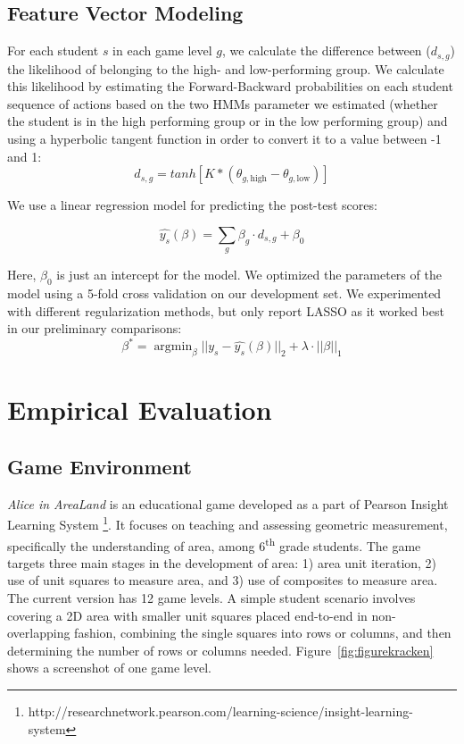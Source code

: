 \documentclass{sigchi}
\DeclareMathOperator*{\argmin}{argmin}
\begin{document}
\subsection{Feature Vector Modeling}

For each student $s$ in each game level $g$, we calculate the difference between ($d_{s,g}$) the likelihood of belonging to the high- and low-performing group.
We calculate this likelihood by estimating the Forward-Backward probabilities  on each student sequence of actions  based on the two HMMs parameter we estimated (whether the student is in the high performing group or in the low performing group) and using a hyperbolic tangent function in order to convert it to a value between -1 and 1: 
\begin{equation}
d_{s,g} = tanh[ K * (\theta_{g, \text{high}} - \theta_{g, \text{low}})]
\end{equation}

We use  a linear regression model for predicting the post-test scores:

\begin{equation}
\hat {y_s}(\beta) =   \sum_g \beta_g \cdot d_{s,g}  + \beta_0
\end{equation}

Here, $\beta_0$ is just an intercept for the  model.  
We optimized the parameters of the model using a 5-fold cross validation on our development set.
We experimented with different regularization methods, but only report LASSO \cite{tibshirani1996regression} as it worked best in our preliminary comparisons:
\begin{equation}
\beta^* = \argmin_\beta || y_s - \hat{y_s}(\beta)  ||_2 + \lambda \cdot || \beta ||_1
\end{equation}


\section{Empirical Evaluation}

\subsection{Game Environment}
\textit {Alice in AreaLand} is an educational game developed as a part of Pearson Insight Learning System \footnote{http://researchnetwork.pearson.com/learning-science/insight-learning-system}. 
It focuses on teaching and assessing geometric measurement, specifically the understanding of area, among 6\textsuperscript{th} grade students. 
The game targets three main stages in the development of area: 1) area unit iteration, 2) use of unit squares to measure area, and 3) use of composites to measure area. 
The current version has 12 game levels. 
A simple student scenario involves covering a 2D area with smaller unit squares placed end-to-end in non-overlapping fashion, combining the single squares into rows or columns, and then determining the number of rows or columns needed. 
Figure~\ref{fig:figurekracken} shows a screenshot of one game level.
\end{document}
